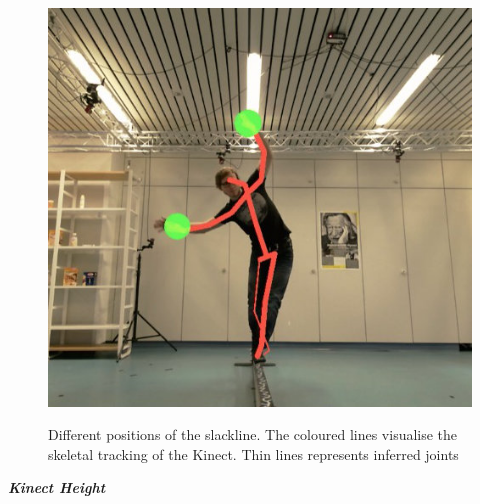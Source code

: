 \begin{figure}[htb]
\begin{minipage}[t]{0.32\linewidth}
		\label{fig:5_3_slacklineDiagonal}
	\end{minipage}
	\hfill
	\begin{minipage}[t]{0.32\linewidth}
		\centering
		\includegraphics[width=1\linewidth]{Pictures/5_3_slacklineVertical}
		\label{fig:5_3_slacklineVertical}
	\end{minipage}
	\caption{Different positions of the slackline. The coloured lines visualise the skeletal tracking of the Kinect. Thin lines represents inferred joints}
	\label{fig:5_3_slacklinePositionings}
\end{figure}

\textbf{\textit{Kinect Height}}

